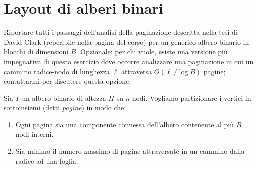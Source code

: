 \chapter{Layout di alberi binari}

\begin{problem*}
  Riportare tutti i passaggi dell'analisi della paginazione descritta nella
  tesi di David Clark (reperibile nella pagina del corso) per un generico
  albero binario in blocchi di dimensioni \(B\). Opzionale: per chi vuole,
  esiste una versione pi\`u impegnativa di questo esercizio dove occorre
  analizzare una paginazione in cui un cammino radice-nodo di lunghezza \(\ell
  \) attraversa \(O(\ell\,/\log{B})\) pagine; contattarmi per discutere questa
  opzione.
\end{problem*}

Sia \(T\) un albero binario di altezza \(H\) su \(n\) nodi. Vogliamo 
partizionare i vertici in sottoinsiemi (detti \emph{pagine}) in modo che:
\begin{enumerate}
  \item Ogni pagina sia una componente connessa dell'albero contenente al 
  pi\`u \(B\) nodi interni.
  \item Sia minimo il numero massimo di pagine attraversate in un cammino
  dalla radice ad una foglia.
\end{enumerate}
